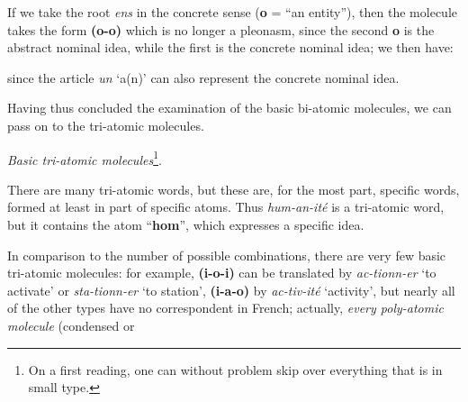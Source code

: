 \begin{sloppypar}
{ }
 {If we take the root \emph{ens} in the concrete sense
   (\textbf{o} = ``an entity''), then the molecule takes the
   form \textbf{(o-o)} which is no longer a pleonasm, since
   the second \textbf{o} is the abstract nominal idea, while the first
   is the concrete nominal idea; we then have:\\[1ex]

   \begin{center}
     {\setlength{\tabcolsep}{4pt}
       }
   \end{center}
   since the article \emph{un} `a(n)' can also represent the concrete
   nominal idea.

   Having thus concluded the examination of the basic bi-atomic
   molecules, we can pass on to the tri-atomic molecules.

   \begin{center}
     \emph{Basic tri-atomic molecules}\footnote{On a first reading, one
         can without problem skip over everything that is in small
         type.}.
   \end{center}

   {\small
     There are many tri-atomic words, but these are, for the most
     part, specific words, formed at least in part of specific
     atoms. Thus \emph{hum-an-ité} is a tri-atomic word, but it
     contains the atom ``\textbf{hom}'', which expresses a specific
     idea.

     In comparison to the number of possible combinations, there are
     very few basic tri-atomic molecules: for example,
     \textbf{(i-o-i)} can be translated by \emph{ac-tionn-er} `to
     activate' or \emph{sta-tionn-er} `to station', \textbf{(i-a-o)} by
     \emph{ac-tiv-ité} `activity', but nearly all of the other types
     have no correspondent in French; actually, \emph{every
       poly-atomic molecule} (condensed or }

 }

\end{sloppypar}
